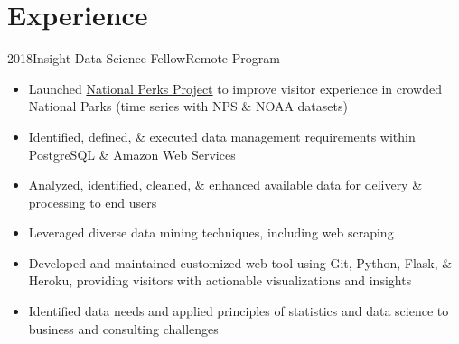 \documentclass[letterpaper]{twentysecondcv} %
\begin{document}
\section{Experience}
\begin{twenty}

        	\twentyitem
    	{2018}{}{Insight Data Science Fellow}{Remote Program}
        	{}
        { \vspace{-2mm}
        {\begin{itemize}
        \item Launched \textcolor{special}{\href{http://www.nationalperks.fun}{National Perks Project}} to improve visitor experience in crowded National Parks (time series with NPS \& NOAA datasets)
        \item Identified, defined, \& executed data management requirements within PostgreSQL \& Amazon Web Services
        \item Analyzed, identified, cleaned, \& enhanced available data for delivery \& processing to end users
        \item Leveraged diverse data mining techniques, including web scraping
        \item Developed and maintained customized web tool using Git, Python, Flask, \& Heroku, providing visitors with actionable visualizations and insights
        \item Identified data needs and applied principles of statistics and data science to business and consulting challenges
    \end{itemize}}  \vspace{6mm} } 
    

\end{twenty}
\end{document}

